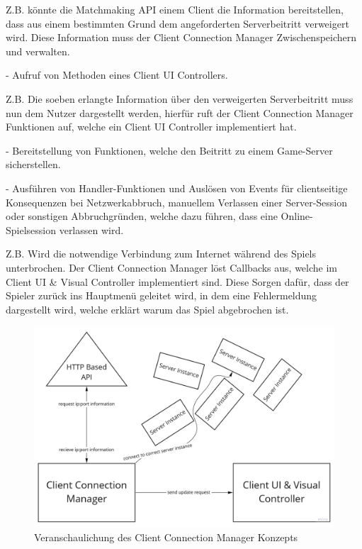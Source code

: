 Z.B. könnte die Matchmaking API einem Client die Information bereitstellen, dass aus einem bestimmten Grund dem angeforderten Serverbeitritt verweigert wird. Diese Information muss der Client Connection Manager Zwischenspeichern und verwalten.

- Aufruf von Methoden eines Client UI Controllers.

Z.B. Die soeben erlangte Information über den verweigerten Serverbeitritt muss nun dem Nutzer dargestellt werden, hierfür ruft der Client Connection Manager Funktionen auf, welche ein Client UI Controller implementiert hat.

- Bereitstellung von Funktionen, welche den Beitritt zu einem Game-Server sicherstellen.

- Ausführen von Handler-Funktionen und Auslösen von Events für clientseitige Konsequenzen bei Netzwerkabbruch, manuellem Verlassen einer Server-Session oder sonstigen Abbruchgründen, welche dazu führen, dass eine Online-Spielsession verlassen wird.

Z.B. Wird die notwendige Verbindung zum Internet während des Spiels unterbrochen. Der Client Connection Manager löst Callbacks aus, welche im Client UI \& Visual Controller implementiert sind. Diese Sorgen dafür, dass der Spieler zurück ins Hauptmenü geleitet wird, in dem eine Fehlermeldung dargestellt wird, welche erklärt warum das Spiel abgebrochen ist.

\begin{figure}
	\centering
	\includegraphics[width=150mm]{images/Client_Connection_Manager.jpg}
	\caption[Client Connection Manager Diagramm]{Veranschaulichung des Client Connection Manager Konzepts}
	\label{pic:Client_Connection_Manager}
\end{figure}



